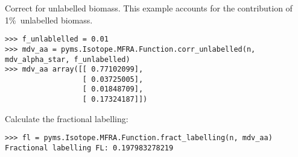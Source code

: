 Correct for unlabelled biomass. This example accounts for the contribution
of 1\%\ unlabelled biomass.

\begin{verbatim}
>>> f_unlablelled = 0.01 
>>> mdv_aa = pyms.Isotope.MFRA.Function.corr_unlabelled(n, mdv_alpha_star, f_unlabelled)
>>> mdv_aa array([[ 0.77102099],
                  [ 0.03725005],
                  [ 0.01848709],
                  [ 0.17324187]])
\end{verbatim}

Calculate the fractional labelling:

\begin{verbatim}
>>> fl = pyms.Isotope.MFRA.Function.fract_labelling(n, mdv_aa)
Fractional labelling FL: 0.197983278219
\end{verbatim}